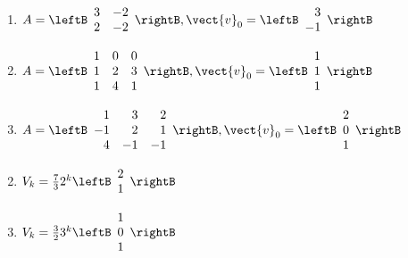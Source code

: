 \begin{multicols}{2}
\begin{ex}
\begin{enumerate}[label={\alph*.}]
\item $A = \leftB \begin{array}{rr}
3 & -2 \\
2 & -2 
\end{array}\rightB, \vect{v}_0 = \leftB \begin{array}{r}
3 \\
-1
\end{array}\rightB$


\item $A = \leftB \begin{array}{rrr}
1 & 0 & 0  \\
1 & 2 & 3 \\
1 & 4 & 1  
\end{array}\rightB, \vect{v}_0 = \leftB \begin{array}{r}
1 \\
1 \\
1
\end{array}\rightB$


\item $A = \leftB \begin{array}{rrr}
1 & 3 & 2  \\
-1 & 2 & 1 \\
4 & -1 & -1  
\end{array}\rightB, \vect{v}_0 = \leftB \begin{array}{r}
2 \\
0 \\
1
\end{array}\rightB$


\end{enumerate}
\begin{sol}
\begin{enumerate}[label={\alph*.}]
\setcounter{enumi}{1}
\item  $V_k = \frac{7}{3} 2^k  \leftB \begin{array}{r}
2 \\
1
\end{array}\rightB$


\setcounter{enumi}{3}
\item  $V_k = \frac{3}{2} 3^k  \leftB \begin{array}{r}
1 \\
0 \\
1
\end{array}\rightB$


\end{enumerate}
\end{sol}
\end{ex}



\end{multicols}
